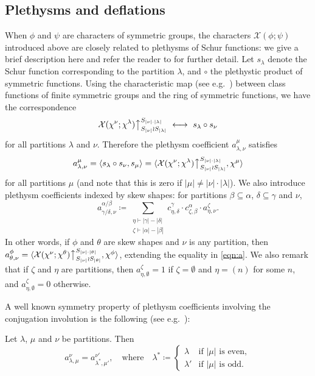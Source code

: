 \documentclass[ALCO, Unicode]{cedram}
\newcommand{\up}{\big\uparrow}
\newcommand{\cX}{\mathcal{X}}
\begin{document}
\subsection{Plethysms and deflations}\label{sec:plethysm-deflation}
When $\phi$ and $\psi$ are characters of symmetric groups, the characters $\cX(\phi;\psi)$ introduced above are closely related to plethysms of Schur functions: we give a brief description here and refer the reader to \cite{dBPW, Mac, Stanley} for further detail. Let $s_\lambda$ denote the Schur function corresponding to the partition $\lambda$, and $\circ$ the plethystic product of symmetric functions. Using the characteristic map (see e.g.~\cite[Chapter 7]{Stanley}) between class functions of finite symmetric groups and the ring of symmetric functions, we have the correspondence
\[ \cX(\chi^\nu;\chi^\lambda)\up_{S_{|\nu|}\wr S_{|\lambda|}}^{S_{|\nu|\cdot|\lambda|}}\ \longleftrightarrow\ s_\lambda\circ s_\nu \]
for all partitions $\lambda$ and $\nu$. Therefore the plethysm coefficient $a^\mu_{\lambda,\nu}$ satisfies
\begin{equation}\label{eqn:a}
	a^\mu_{\lambda,\nu} = \langle s_\lambda\circ s_\nu, s_\mu\rangle = \langle \cX(\chi^\nu;\chi^\lambda)\up_{S_{|\nu|}\wr S_{|\lambda|}}^{S_{|\nu|\cdot|\lambda|}}, \chi^\mu \rangle	
\end{equation}
for all partitions $\mu$ (and note that this is zero if $|\mu|\ne|\nu|\cdot|\lambda|$). 
We also introduce plethysm coefficients indexed by skew shapes: for partitions $\beta\subseteq\alpha$, $\delta\subseteq\gamma$ and $\nu$,
\begin{equation}\label{eqn:skew-plethysm}
	a^{\alpha/\beta}_{\gamma/\delta,\nu}\coloneqq  \sum_{\substack{\eta\vdash|\gamma|-|\delta|\\\zeta\vdash|\alpha|-|\beta|}} c^\gamma_{\eta,\delta}\cdot c^\alpha_{\zeta,\beta}\cdot a^\zeta_{\eta,\nu}.
\end{equation}
In other words, if $\phi$ and $\theta$ are skew shapes and $\nu$ is any partition, then $a^\phi_{\theta,\nu} = \langle \cX(\chi^\nu; \chi^\theta)\up_{S_{|\nu|}\wr S_{|\theta|}}^{S_{|\nu|\cdot|\theta|}}, \chi^\phi\rangle$, extending the equality in \eqref{eqn:a}. We also remark that if $\zeta$ and $\eta$ are partitions, then $a^\zeta_{\eta,\emptyset}=1$ if $\zeta=\emptyset$ and $\eta=(n)$ for some $n$, and $a^\zeta_{\eta,\emptyset}=0$ otherwise. 

A well known symmetry property of plethysm coefficients involving the conjugation involution is the following (see e.g.~\cite[Ex.~1, Ch. I.8]{Mac}):
\begin{lemma}\label{lem:conj-plethysm}
	Let $\lambda$, $\mu$ and $\nu$ be partitions. Then
	\[ a^\nu_{\lambda,\mu} = a^{\nu'}_{\lambda^\ast,\mu'},\quad\text{where}\quad \lambda^\ast\coloneqq \begin{cases} \lambda & \text{if $|\mu|$ is even},\\ \lambda' & \text{if $|\mu|$ is odd}.\end{cases} \]
\end{lemma}
\end{document}

